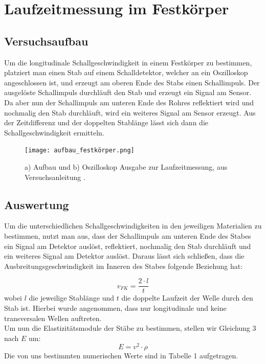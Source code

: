 \documentclass{article}
\begin{document}
\section{Laufzeitmessung im Festkörper}
\subsection{Versuchsaufbau}
Um die longitudinale Schallgeschwindigkeit in einem Festkörper zu bestimmen, platziert man einen Stab auf einem Schalldetektor, welcher an ein Oszilloskop angeschlossen ist, und erzeugt am oberen Ende des Stabs einen Schallimpuls.
Der ausgelöste Schallimpuls durchläuft den Stab und erzeugt ein Signal am Sensor. Da aber nun der Schallimpuls am unteren Ende des Rohres reflektiert wird und nochmalig den Stab durchläuft, wird ein weiteres Signal am Sensor erzeugt. Aus der Zeitdifferenz und der doppelten Stablänge lässt sich dann die Schallgeschwindigkeit ermitteln.
\begin{figure}[hbt!]
\centering
\texttt{[image: aufbau\_festkörper.png]}
\caption{ a) Aufbau und b) Oszilloskop Ausgabe zur Laufzeitmessung, aus Versuchsanleitung \cite{1}.}
\end{figure}
\subsection{Auswertung}
Um die unterschiedlichen Schallgeschwindigkeiten in den jeweiligen Materialien zu bestimmen, nutzt man aus, dass der Schallimpuls am unteren Ende des Stabes ein Signal am Detektor auslöst, reflektiert, nochmalig den Stab durchläuft und ein weiteres Signal am Detektor auslöst. Daraus lässt sich schließen, dass die Ausbreitungsgeschwindigkeit im Inneren des Stabes folgende Beziehung hat:

\begin{equation}
v_{FK} = \frac{2 \cdot l}{t}
\end{equation}
wobei $l$ die jeweilige Stablänge und $t$ die doppelte Laufzeit der Welle durch den Stab ist. Hierbei wurde angenommen, dass nur longitudinale und keine transversalen Wellen auftreten.\\
Um nun die Elastizitätsmodule der Stäbe zu bestimmen, stellen wir Gleichung 3 nach $E$ um:
\begin{equation}
    E = v^2 \cdot \rho
\end{equation}
Die von uns bestimmten numerischen Werte sind in Tabelle 1 aufgetragen.
\end{document}
